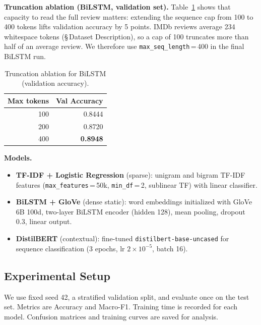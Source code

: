 \textbf{Truncation ablation (BiLSTM, validation set).} Table~\ref{tab:q1_trunc} shows that capacity to read the full review matters: extending the sequence cap from 100 to 400 tokens lifts validation accuracy by 5 points. IMDb reviews average 234 whitespace tokens (\S\,Dataset Description), so a cap of 100 truncates more than half of an average review. We therefore use \texttt{max\_seq\_length}\,=\,400 in the final BiLSTM run.

\begin{table}[H]
\centering
\caption{Truncation ablation for BiLSTM (validation accuracy).}
\label{tab:q1_trunc}
\begin{tabular}{rr}
\toprule
\textbf{Max tokens} & \textbf{Val Accuracy} \\
\midrule
100 & 0.8444 \\
200 & 0.8720 \\
400 & \textbf{0.8948} \\
\bottomrule
\end{tabular}
\end{table}

\textbf{Models.}
\begin{itemize}[leftmargin=*]
		\item \textbf{TF-IDF + Logistic Regression} \citep{Pedregosa2011sklearn} (sparse): unigram and bigram TF-IDF features (\texttt{max\_features}\,=\,50k, \texttt{min\_df}\,=\,2, sublinear TF) with linear classifier.
		\item \textbf{BiLSTM + GloVe} \citep{Pennington2014glove} (dense static): word embeddings initialized with GloVe 6B 100d, two-layer BiLSTM encoder (hidden 128), mean pooling, dropout 0.3, linear output.
		\item \textbf{DistilBERT} \citep{Sanh2019distilbert} (contextual): fine-tuned \texttt{distilbert-base-uncased} for sequence classification (3 epochs, lr $2\!\times\!10^{-5}$, batch 16).
\end{itemize}

\subsection{Experimental Setup}
We use fixed seed 42, a stratified validation split, and evaluate once on the test set. Metrics are Accuracy and Macro-F1. Training time is recorded for each model. Confusion matrices and training curves are saved for analysis.

